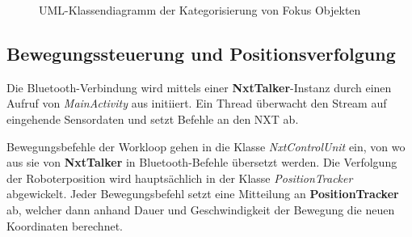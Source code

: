 \begin{figure}[H]
\centering
{}
\caption{UML-Klassendiagramm der Kategorisierung von Fokus Objekten}
\label{fig:UMLCategorisation}
\end{figure}

\subsection{Bewegungssteuerung und Positionsverfolgung}

Die Bluetooth-Verbindung wird mittels einer \textbf{NxtTalker}-Instanz durch einen Aufruf von \textit{MainActivity} aus initiiert. Ein Thread überwacht den Stream auf eingehende Sensordaten und setzt Befehle an den NXT ab.

Bewegungsbefehle der Workloop gehen in die Klasse \textit{NxtControlUnit} ein, von wo aus sie von \textbf{NxtTalker} in Bluetooth-Befehle übersetzt werden. Die Verfolgung der Roboterposition wird hauptsächlich in der Klasse \textit{PositionTracker} abgewickelt. Jeder Bewegungsbefehl setzt eine Mitteilung an \textbf{PositionTracker} ab, welcher dann anhand Dauer und Geschwindigkeit der Bewegung die neuen Koordinaten berechnet.

